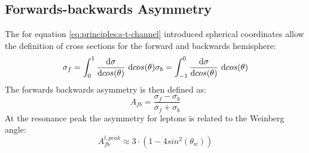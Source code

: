 \subsection{Forwards-backwards Asymmetry}
The for equation \ref{eq:principles:s-t-channel} introduced spherical coordinates allow the definition of cross sections for the forward and backwards hemisphere:
\begin{equation}
\sigma_f=\int_{0}^{1}\frac{\text{d}\sigma}{\text{d}cos(\theta)}~\text{d}cos(\theta) \\
\sigma_b=\int_{-1}^{0}\frac{\text{d}\sigma}{\text{d}cos(\theta)}~\text{d}cos(\theta)
\end{equation}
The forwards backwards asymmetry is then defined as:
\begin{equation}
A_{fb}=\frac{\sigma_f-\sigma_b}{\sigma_f+\sigma_b}
\label{eq:principles:asymmetry definition}
\end{equation}
At the resonance peak the asymmetry for leptons is related to the Weinberg angle\cite{muenchen}:
\begin{equation}
A_{fb}^{l,peak}\approx 3\cdot (1-4 sin^2(\theta_w))
\label{eq:principles:asymmetry weinberg angle}
\end{equation}